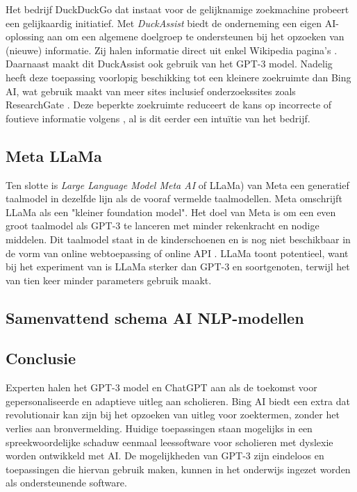 Het bedrijf DuckDuckGo dat instaat voor de gelijknamige zoekmachine probeert een gelijkaardig initiatief. Met \textit{DuckAssist} biedt de onderneming een eigen AI-oplossing aan om een algemene doelgroep te ondersteunen bij het opzoeken van (nieuwe) informatie. Zij halen informatie direct uit enkel Wikipedia pagina's \autocite{Weinberg2023}. Daarnaast maakt dit DuckAssist ook gebruik van het GPT-3 model. Nadelig heeft deze toepassing voorlopig beschikking tot een kleinere zoekruimte dan Bing AI, wat gebruik maakt van meer sites inclusief onderzoekssites zoals ResearchGate \autocite{Mcauliffe2023}. Deze beperkte zoekruimte reduceert de kans op incorrecte of foutieve informatie volgens \textcite{Weinberg2023}, al is dit eerder een intuïtie van het bedrijf.


\subsection{Meta LLaMa}

Ten slotte is \textit{\textit{Large Language Model Meta AI}} of LLaMa) van Meta een generatief taalmodel in dezelfde lijn als de vooraf vermelde taalmodellen. Meta omschrijft LLaMa als een "kleiner foundation model". Het doel van Meta is om een even groot taalmodel als GPT-3 te lanceren met minder rekenkracht en nodige middelen. Dit taalmodel staat in de kinderschoenen en is nog niet beschikbaar in de vorm van online webtoepassing of online API \autocite{Hern2023, Touvron2023}. LLaMa toont potentieel, want bij het experiment van \textcite{Touvron2023} is LLaMa sterker dan GPT-3 en soortgenoten, terwijl het van tien keer minder parameters gebruik maakt.

\subsection{Samenvattend schema AI NLP-modellen}

\subsection{Conclusie}

Experten halen het GPT-3 model en ChatGPT aan als de toekomst voor gepersonaliseerde en adaptieve uitleg aan scholieren. Bing AI biedt een extra dat revolutionair kan zijn bij het opzoeken van uitleg voor zoektermen, zonder het verlies aan bronvermelding. Huidige toepassingen staan mogelijks in een spreekwoordelijke schaduw eenmaal leessoftware voor scholieren met dyslexie worden ontwikkeld met AI. De mogelijkheden van GPT-3 zijn eindeloos en toepassingen die hiervan gebruik maken, kunnen in het onderwijs ingezet worden als ondersteunende software.

